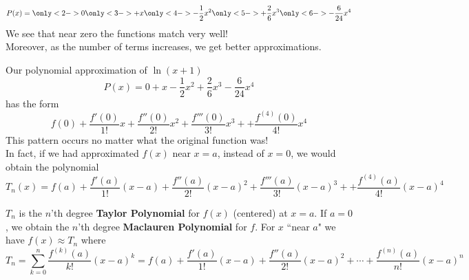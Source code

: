 
\begin{frame}

\[
 P(x)= \only<2->{ 0 \only<3->{+ x \only<4->{-\frac12x^2 \only<5->{+\frac26 x^3 \only<6->{-\frac{6}{24} x^4}}}}} 
\]
We see that near zero the functions match very well!\\
Moreover, as the number of terms increases, we get better approximations.


\end{frame}

\begin{frame}
Our polynomial approximation of $ \ln(x+1) $ \[
 P(x)= 0+ x  -\frac12x^2  +\frac26 x^3  -\frac{6}{24} x^4 
\]
has the form 
\[
f(0) + \frac{f'(0)}{1!}x + \frac{f''(0)}{2!}x^2 + \frac{f'''(0)}{3!}x^3 + + \frac{f^{(4)}(0)}{4!}x^4
\]
\pause 
This pattern occurs no matter what the original function was!\\
\pause 
In fact, if we had approximated $ f(x) $ near $ x=a $, instead of $ x=0 $, we would obtain the polynomial
\[
T_n(x) = f(a) + \frac{f'(a)}{1!}(x-a) + \frac{f''(a)}{2!}(x-a)^2 + \frac{f'''(a)}{3!}(x-a)^3 + + \frac{f^{(4)}(a)}{4!}(x-a)^4
\]
\pause 
\begin{definition}
$ T_n $ is the $ n $'th degree \textbf{Taylor Polynomial} for $ f(x) $ (centered) at $ x=a $. If $ a=0 $, we obtain the $ n $'th degree \textbf{Maclauren Polynomial} for $ f $. For $ x $ ``near  $ a $" we have $ f(x) \approx T_n $ where
\abovedisplayskip=0pt
\belowdisplayskip=0pt
\[
T_n= \sum_{k=0}^n \frac{f^{(k)}(a)}{k!}(x-a)^k = f(a)+ \frac{f'(a)}{1!}(x-a) + \frac{f''(a)}{2!}(x-a)^2   + \cdots +\frac{f^{(n)}(a)}{n!}(x-a)^n%
\]
\end{definition}



\end{frame}

